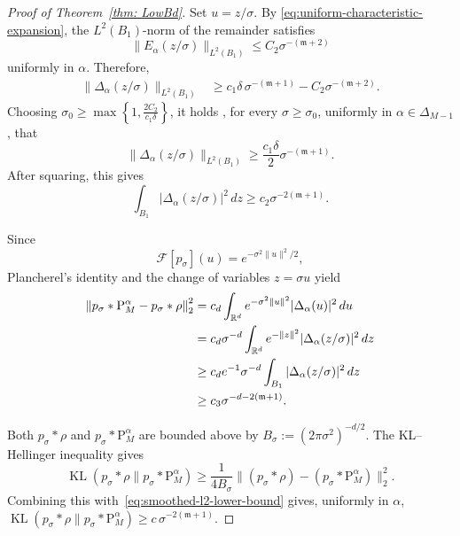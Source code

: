 \documentclass[12pt]{iopart}
\theoremstyle{remark}
\begin{document}
\begin{proof}[Proof of Theorem~\ref{thm: LowBd}]
Set \(u=z/\sigma\). By
\eqref{eq:uniform-characteristic-expansion}, the \(L^2(B_1)\)-norm of
the remainder satisfies
\[
  \bigl\|E_\alpha(z/\sigma)\bigr\|_{L^2(B_1)}
  \leq
  C_2\sigma^{-(\mathfrak{m}+2)}
\]
uniformly in \(\alpha\). Therefore,
\begin{align*}
  \bigl\|\Delta_\alpha(z/\sigma)\bigr\|_{L^2(B_1)}
  &\geq
  c_1\delta\,\sigma^{-(\mathfrak{m}+1)}
  -
  C_2\sigma^{-(\mathfrak{m}+2)}.
\end{align*}
Choosing
\(
  \sigma_0
  \geq
  \max\left\{
    1,\frac{2C_2}{c_1\delta}
  \right\}\), it holds , for every \(\sigma\geq\sigma_0\), uniformly in
\(\alpha\in\Delta_{M-1}\), that
\[
  \bigl\|\Delta_\alpha(z/\sigma)\bigr\|_{L^2(B_1)}
  \geq
  \frac{c_1\delta}{2}
  \sigma^{-(\mathfrak{m}+1)}.
\]
After squaring, this gives
\begin{equation}
  \int_{B_1}
  \left|\Delta_\alpha(z/\sigma)\right|^2\,dz
  \geq
  c_2\sigma^{-2(\mathfrak{m}+1)}.
  \label{eq:characteristic-lower-bound}
\end{equation}

Since
\[
  \mathcal{F}[p_\sigma](u)
  =
  e^{-\sigma^2\|u\|^2/2},
\]
Plancherel's identity and the change of variables \(z=\sigma u\)
yield
\begin{align}
  \left\|
    p_\sigma*\mathrm{P}_M^\alpha-p_\sigma*\rho
  \right\|_2^2
  &=
  c_d
  \int_{\mathbb{R}^d}
  e^{-\sigma^2\|u\|^2}
  |\Delta_\alpha(u)|^2\,du
  \notag\\
  &=
  c_d\sigma^{-d}
  \int_{\mathbb{R}^d}
  e^{-\|z\|^2}
  |\Delta_\alpha(z/\sigma)|^2\,dz
  \notag\\
  &\geq
  c_de^{-1}\sigma^{-d}
  \int_{B_1}
  |\Delta_\alpha(z/\sigma)|^2\,dz
  \notag\\
  &\geq
  c_3
  \sigma^{-d-2(\mathfrak{m}+1)}.
  \label{eq:smoothed-l2-lower-bound}
\end{align}


Both $p_\sigma*\rho$ and $p_\sigma*\mathrm P_M^\alpha$ are bounded above by
$B_\sigma:=(2\pi\sigma^2)^{-d/2}$. The KL--Hellinger inequality gives
\[
\operatorname{KL}(p_\sigma*\rho\|p_\sigma*\mathrm P_M^\alpha)
\geq\frac1{4B_\sigma}
\|(p_\sigma*\rho)-(p_\sigma*\mathrm P_M^\alpha)\|_2^2.
\]
Combining this with~\eqref{eq:smoothed-l2-lower-bound} gives, uniformly in
$\alpha$,
\(
\operatorname{KL}(p_\sigma*\rho\|p_\sigma*\mathrm P_M^\alpha)
\geq c\,\sigma^{-2(\mathfrak m+1)}.
\)
\end{proof}
\end{document}
